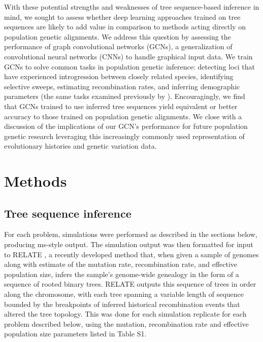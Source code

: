 With these potential strengths and weaknesses of tree sequence-based inference in mind, we sought to assess whether deep learning approaches trained on tree sequences are likely to add value in comparison to methods acting directly on population genetic alignments. We address this question by assessing the performance of graph convolutional networks (GCNs), a generalization of convolutional neural networks (CNNs) to handle graphical input data. We train GCNs to solve common tasks in population genetic inference: detecting loci that have experienced introgression between closely related species, identifying selective sweeps, estimating recombination rates, and inferring demographic parameters (the same tasks examined previously by \cite{flagelUnreasonableEffectivenessConvolutional2019}). Encouragingly, we find that GCNs trained to use inferred tree sequences yield equivalent or better accuracy to those trained on population genetic alignments. We close with a discussion of the implications of our GCN’s performance for future population genetic research leveraging this increasingly commonly used representation of evolutionary histories and genetic variation data.


\section{Methods}

\subsection{Tree sequence inference}

For each problem, simulations were performed as described in the sections below, producing ms-style output. The simulation output was then formatted for input to RELATE \cite{speidelMethodGenomewideGenealogy2019a}, a recently developed method that, when given a sample of genomes along with estimate of the mutation rate, recombination rate, and effective population size, infers the sample’s genome-wide genealogy in the form of a sequence of rooted binary trees. RELATE outputs this sequence of trees in order along the chromosome, with each tree spanning a variable length of sequence bounded by the breakpoints of inferred historical recombination events that altered the tree topology. This was done for each simulation replicate for each problem described below, using the mutation, recombination rate and effective population size parameters listed in Table S1. 

